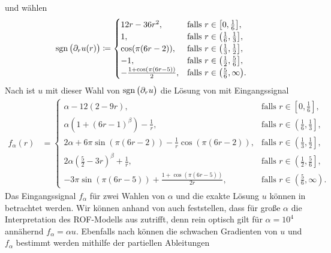 und wählen
\begin{align*}
  \operatorname{sgn}\big(\partial_r u(r)\big) 
  &\coloneqq
  \begin{cases}
    12r-36r^2, 
    & \text{falls } r\in \left[0,\frac{1}{6}\right]\!,\\
    1, 
    & \text{falls } r\in \left(\frac{1}{6}, \frac{1}{3}\right]\!,\\
    \cos(\pi(6r-2)), 
    & \text{falls } r\in \left(\frac{1}{3}, \frac{1}{2}\right]\!,\\
    -1, 
    & \text{falls } r\in \left(\frac{1}{2}, \frac{5}{6}\right]\!,\\
    -\frac{1+\cos(\pi(6r-5))}{2}, 
    & \text{falls } r\in \left(\frac{5}{6}, \infty\right)\!.
  \end{cases}
\end{align*}
Nach  ist $u$ mit dieser Wahl von
$\operatorname{sgn}\big(\partial_r u\big)$ die Lösung von  mit
Eingangssignal
\begin{align}
  \label{eq:inputSignalF01}
  f_\alpha(r)
  &=
  \begin{cases}
    \alpha-12(2-9r), 
    & \text{falls } r\in \left[0,\frac{1}{6}\right]\!,\\
    \alpha\left(1+(6r-1)^\beta\right)-\frac{1}{r}, 
    & \text{falls } r\in \left(\frac{1}{6}, \frac{1}{3}\right]\!,\\
    2\alpha+6\pi\sin(\pi(6r-2))-\frac{1}{r}\cos(\pi(6r-2)), 
    & \text{falls } r\in \left(\frac{1}{3}, \frac{1}{2}\right]\!,\\
    2\alpha\left(\frac{5}{2}-3r\right)^\beta+\frac{1}{r},
    & \text{falls } r\in \left(\frac{1}{2}, \frac{5}{6}\right]\!,\\
    -3\pi\sin(\pi(6r-5))+\frac{1+\cos(\pi(6r-5))}{2r}, 
    & \text{falls } r\in \left(\frac{5}{6}, \infty\right)\!.
  \end{cases}
\end{align}
Das Eingangssignal $f_\alpha$ für zwei Wahlen von $\alpha$ und die exakte
Lösung $u$ können in  betrachtet werden.
Wir können anhand von  auch feststellen, dass für große
$\alpha$ die Interpretation des ROF-Modells aus 
zutrifft, denn rein optisch gilt für $\alpha=10^4$ annähernd $f_\alpha=\alpha
u$.
Ebenfalls nach  können die schwachen
Gradienten von $u$ und $f_\alpha$ bestimmt werden mithilfe der partiellen 
Ableitungen
